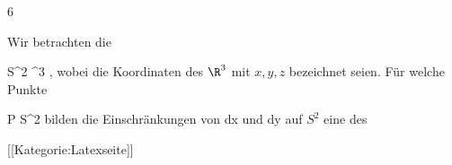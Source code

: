 {6}
{

Wir betrachten die

\mavergleichskette
{\vergleichskette
{ S^2
}
{ \subseteq }{ \R^3
}
{  }{
}
{    }{
}
{   }{
}
}
{}{}{,}
wobei die Koordinaten des $\R^3$ mit $x,y,z$ bezeichnet seien. Für welche Punkte

\mavergleichskette
{\vergleichskette
{ P
}
{ \in }{ S^2
}
{  }{
}
{    }{
}
{   }{
}
}
{}{}{}
bilden die Einschränkungen von
\mathkor {} {dx} {und} {dy} {}
auf $S^2$ eine
des


}
{} {}

 [[Kategorie:Latexseite]]
